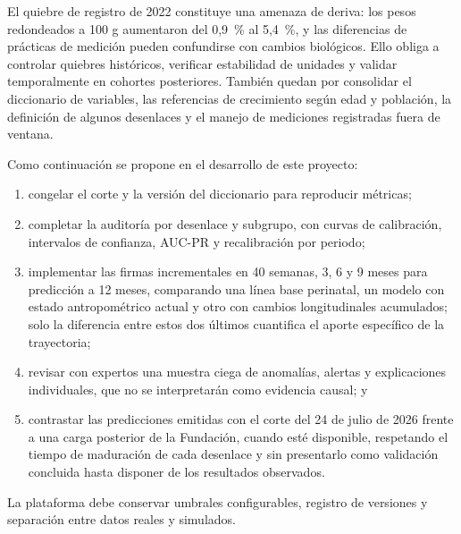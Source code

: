 \documentclass[letterpaper,10pt]{article}
\begin{document}
El quiebre de registro de 2022 constituye una amenaza de deriva: los pesos redondeados a 100 g aumentaron del 0,9~\% al 5,4~\%, y las diferencias de prácticas de medición pueden confundirse con cambios biológicos. Ello obliga a controlar quiebres históricos, verificar estabilidad de unidades y validar temporalmente en cohortes posteriores. También quedan por consolidar el diccionario de variables, las referencias de crecimiento según edad y población, la definición de algunos desenlaces y el manejo de mediciones registradas fuera de ventana.

Como continuación se propone en el desarrollo de este proyecto:
\begin{enumerate}[label=(\roman*),leftmargin=*,itemsep=0pt,topsep=0pt]
\item congelar el corte y la versión del diccionario para reproducir métricas;
\item completar la auditoría por desenlace y subgrupo, con curvas de calibración, intervalos de confianza, AUC-PR y recalibración por periodo;
\item implementar las firmas incrementales en 40 semanas, 3, 6 y 9 meses para predicción a 12 meses, comparando una línea base perinatal, un modelo con estado antropométrico actual y otro con cambios longitudinales acumulados; solo la diferencia entre estos dos últimos cuantifica el aporte específico de la trayectoria;
\item revisar con expertos una muestra ciega de anomalías, alertas y explicaciones individuales, que no se interpretarán como evidencia causal; y
\item contrastar las predicciones emitidas con el corte del 24 de julio de 2026 frente a una carga posterior de la Fundación, cuando esté disponible, respetando el tiempo de maduración de cada desenlace y sin presentarlo como validación concluida hasta disponer de los resultados observados.
\end{enumerate}

La plataforma debe conservar umbrales configurables, registro de versiones y separación entre datos reales y simulados.
\end{document}
